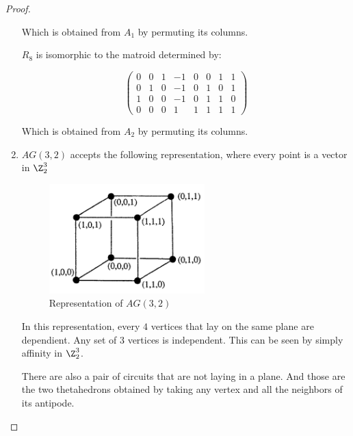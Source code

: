 \begin{proof}
\begin{enumerate}[label=(\roman*)]
            Which is obtained from $A_1$ by permuting its columns.\pn
            
            $R_8$ is isomorphic to the matroid determined by:
            
            \[ \left( 
                \begin{array}{cccccccc}
                   0  & 0  & 1  &-1  & 0 &  0 &  1  & 1 \\
                   0  & 1  & 0  &-1  & 0 &  1 &  0  & 1 \\
                   1  & 0  & 0  &-1  & 0 &  1 &  1  & 0 \\
                   0  & 0  & 0  & 1  & 1 &  1 &  1  & 1
                \end{array} 
            \right)\] 
            
            Which is obtained from $A_2$ by permuting its columns.\pn
            
            
        \item
            $AG(3, 2)$ accepts the following representation, where every point
            is a vector in $\Z_2^3$
            
            \begin{figure}[H]
                \begin{center}
                    \includegraphics[width=6cm]{Test2/Problem7/AG_3_2.png}
                \end{center}                            
                \caption{Representation of $AG(3, 2)$}
                \label{t2:p7_AG_3_2.png}                        
            \end{figure}\pn 
            
            In this representation, every $4$ vertices that lay on the same plane are
            dependient. Any set of 3 vertices is independent. This can be seen by simply
            affinity in $\Z_2^3$.\pn
            
            There are also a pair of circuits that are not laying in a plane. And those are the
            two thetahedrons obtained by taking any vertex and all the neighbors of its antipode.
            

\end{enumerate}
\end{proof}
